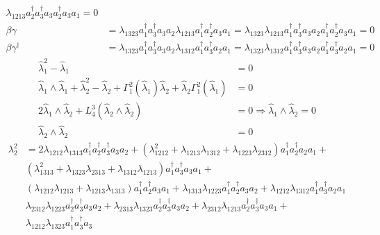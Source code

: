 \documentclass[aps,preprint]{revtex4}%
\begin{document}
\begin{itemize}
\begin{align}
\lambda_{1213}a_{2}^{\dagger}a_{3}^{\dagger}a_{3}a_{2}^{\dagger}a_{3}%
a_{1}=0\nonumber\\
\beta\gamma &  =\lambda_{1323}a_{1}^{\dagger}a_{3}^{\dagger}a_{3}a_{2}%
\lambda_{1213}a_{1}^{\dagger}a_{2}^{\dagger}a_{3}a_{1}=\lambda_{1323}%
\lambda_{1213}a_{1}^{\dagger}a_{3}^{\dagger}a_{3}a_{2}a_{1}^{\dagger}%
a_{2}^{\dagger}a_{3}a_{1}=0\nonumber\\
\beta\gamma^{\dagger}  &  =\lambda_{1323}a_{1}^{\dagger}a_{3}^{\dagger}%
a_{3}a_{2}\lambda_{1312}a_{1}^{\dagger}a_{3}^{\dagger}a_{2}a_{1}%
=\lambda_{1323}\lambda_{1312}a_{1}^{\dagger}a_{3}^{\dagger}a_{3}a_{2}%
a_{1}^{\dagger}a_{3}^{\dagger}a_{2}a_{1}=0
\end{align}%
\begin{align}
\hat{\lambda}_{1}^{2}-\hat{\lambda}_{1}  &  =0\nonumber\\
\hat{\lambda}_{1}\wedge\hat{\lambda}_{1}+\hat{\lambda}_{2}^{2}-\hat{\lambda
}_{2}+\Gamma_{1}^{2}\left(  \hat{\lambda}_{1}\right)  \hat{\lambda}_{2}%
+\hat{\lambda}_{2}\Gamma_{1}^{2}\left(  \hat{\lambda}_{1}\right)   &
=0\nonumber\\
2\hat{\lambda}_{1}\wedge\hat{\lambda}_{2}+L_{4}^{3}\left(  \hat{\lambda}%
_{2}\wedge\hat{\lambda}_{2}\right)   &  =0\Rightarrow\hat{\lambda}_{1}%
\wedge\hat{\lambda}_{2}=0\nonumber\\
\hat{\lambda}_{2}\wedge\hat{\lambda}_{2}  &  =0
\end{align}%
\begin{align}
\lambda_{2}^{2}  &  =2\lambda_{1212}\lambda_{1313}a_{1}^{\dagger}%
a_{2}^{\dagger}a_{3}^{\dagger}a_{3}a_{2}+\left(  \lambda_{1212}^{2}%
+\lambda_{1213}\lambda_{1312}+\lambda_{1223}\lambda_{2312}\right)
a_{1}^{\dagger}a_{2}^{\dagger}a_{2}a_{1}+\nonumber\\
&  \left(  \lambda_{1313}^{2}+\lambda_{1323}\lambda_{2313}+\lambda
_{1312}\lambda_{1213}\right)  a_{1}^{\dagger}a_{3}^{\dagger}a_{3}a_{1}+\\
&  \left(  \lambda_{1212}\lambda_{1213}+\lambda_{1213}\lambda_{1313}\right)
a_{1}^{\dagger}a_{2}^{\dagger}a_{3}a_{1}+\lambda_{1313}\lambda_{1223}%
a_{1}^{\dagger}a_{2}^{\dagger}a_{3}a_{2}+\lambda_{1212}\lambda_{1312}%
a_{1}^{\dagger}a_{3}^{\dagger}a_{2}a_{1}\nonumber\\
&  \lambda_{2312}\lambda_{1223}a_{2}^{\dagger}a_{3}^{\dagger}a_{3}%
a_{2}+\lambda_{2313}\lambda_{1323}a_{2}^{\dagger}a_{3}^{\dagger}a_{3}%
a_{2}+\lambda_{2312}\lambda_{1213}a_{2}^{\dagger}a_{3}^{\dagger}a_{3}%
a_{1}+\nonumber\\
&  \lambda_{1212}\lambda_{1323}a_{1}^{\dagger}a_{3}^{\dagger}a_{3}%

\end{align}
\end{itemize}
\end{document}
